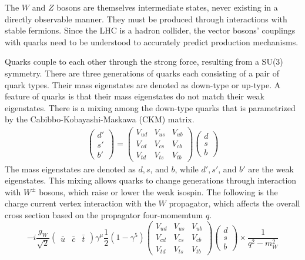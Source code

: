 The $W$ and $Z$ bosons are themselves intermediate states,
never existing in a directly observable manner.
They must be produced through interactions with stable fermions.
Since the LHC is a hadron collider,
the vector bosons' couplings with quarks need to be understood to accurately predict production mechanisms.

Quarks couple to each other through the strong force,
resulting from a SU(3) symmetry.
There are three generations of quarks each consisting of a pair of quark types.
Their mass eigenstates are denoted as down-type or up-type.
A feature of quarks is that their mass eigenstates do not match their weak eigenstates.
There is a mixing among the down-type quarks that is parametrized by the
Cabibbo-Kobayashi-Maskawa (CKM) matrix.
\begin{gather}
  \left(
  \begin{matrix}
    d' \\
    s' \\
    b'
  \end{matrix}
  \right)
  =
  \left(
  \begin{matrix}
    V_{ud} & V_{us} & V_{ub} \\
    V_{cd} & V_{cs} & V_{cb} \\
    V_{td} & V_{ts} & V_{tb}
  \end{matrix}
  \right)
  \left(
  \begin{matrix}
    d \\
    s \\
    b
  \end{matrix}
  \right) \label{eq:ckm}
\end{gather}
The mass eigenstates are denoted as $d, s$, and $b$,
while $d', s'$, and $b'$ are the weak eigenstates.
This mixing allows quarks to change generations through interaction with $W^\pm$ bosons,
which raise or lower the weak isospin.
The following is the charge current vertex interaction with the $W$ propagator,
which affects the overall cross section based on the propagator four-momemtum $q$.
\[
-i \frac{g_W}{\sqrt{2}}
\left(
\begin{matrix}
\bar{u} & \bar{c} & \bar{t}
\end{matrix}
\right)
\gamma^\mu \frac12 (1 - \gamma^5)
\left(
\begin{matrix}
  V_{ud} & V_{us} & V_{ub} \\
  V_{cd} & V_{cs} & V_{cb} \\
  V_{td} & V_{ts} & V_{tb}
\end{matrix}
\right)
\left(
\begin{matrix}
d \\ s \\ b
\end{matrix}
\right) \times \frac{1}{q^2 - m_{W}^2}
\]
